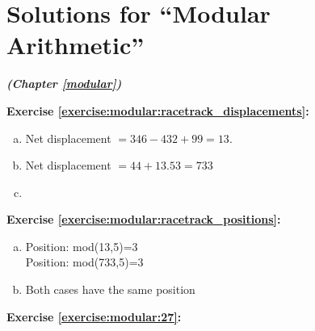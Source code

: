 \section{Solutions for ``Modular Arithmetic''}
\noindent \textbf{\textit{ (Chapter \ref{modular})}}\bigskip




\noindent\textbf{Exercise \ref{exercise:modular:racetrack_displacements}:}
\begin{enumerate}[(a)]
\item
Net displacement $=346-432+99=13$.

\item 
Net displacement $=44+13.53=733$

\item 

\end{enumerate}

\noindent\textbf{Exercise \ref{exercise:modular:racetrack_positions}:}
\begin{enumerate}[(a)]
\item
Position: mod(13,5)=3\\
Position: mod(733,5)=3

\item
Both cases have the same position
\end{enumerate}

\noindent\textbf{Exercise \ref{exercise:modular:27}:} %

